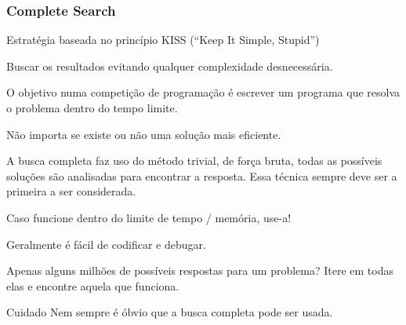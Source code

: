 \begin{frame}
\frametitle{Complete Search}
\begin{block}{}
\begin{itemize}
	\bitem Estratégia baseada no princípio KISS (``Keep It Simple, Stupid'')
	\begin{itemize}
		\bitem Buscar os resultados evitando qualquer complexidade desnecessária.
	\end{itemize}
	\bitem O objetivo numa competição de programação é escrever um programa que resolva o problema dentro do tempo limite.
	\begin{itemize}
		\bitem Não importa se existe ou não uma solução mais eficiente.
	\end{itemize}
	\bitem A busca completa faz uso do método trivial, de força bruta, todas as possíveis soluções são analisadas para encontrar a resposta.
	\bitem Essa técnica sempre deve ser a primeira a ser considerada.
	\begin{itemize}
		\bitem Caso funcione dentro do limite de tempo / memória, use-a! 
		\begin{itemize}
			\bitem Geralmente é fácil de codificar e debugar.
		\end{itemize}
	\end{itemize}
	\bitem Apenas alguns milhões de possíveis respostas para um problema? Itere em todas elas e encontre aquela que funciona.
\end{itemize}
\end{block}
\pause

\begin{block}{\tiny Cuidado}
Nem sempre é óbvio que a busca completa pode ser usada.
\end{block}
\end{frame}

